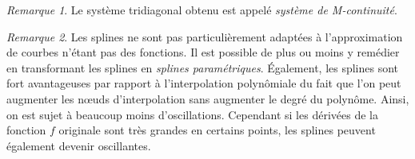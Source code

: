 \documentclass{article}
\theoremstyle{definition}
\theoremstyle{remark}
\newtheorem*{rmq}{Remarque}
\begin{document}
		\begin{rmq} Le système tridiagonal obtenu est appelé \emph{système de M-continuité}. \end{rmq}

		\begin{rmq} Les splines ne sont pas particulièrement adaptées à l'approximation de courbes n'étant pas des fonctions. Il est possible de plus ou moins
		y remédier en transformant les splines en \emph{splines paramétriques}. Également, les splines sont fort avantageuses par rapport à l'interpolation
		polynômiale du fait que l'on peut augmenter les nœuds d'interpolation sans augmenter le degré du polynôme. Ainsi, on est sujet à beaucoup moins
		d'oscillations. Cependant si les dérivées de la fonction $f$ originale sont très grandes en certains points, les splines peuvent également devenir
		oscillantes.
		\end{rmq}
\end{document}
